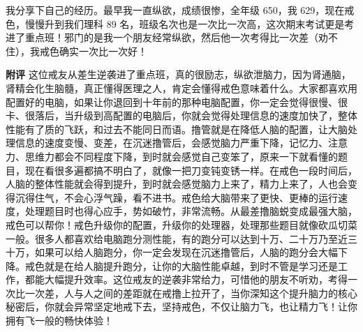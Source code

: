\begin{case}
    我分享下自己的经历。最早我一直纵欲，成绩很惨，全年级 650，我 629，现在戒色，慢慢升到我们理科 89 名，班级名次也是一次比一次高，这次期末考试更是考进了重点班！邪门的是我一个朋友经常纵欲，然后他一次考得比一次差（劝不住），我戒色确实一次比一次好！

    \textbf{附评} 这位戒友从差生逆袭进了重点班，真的很励志，纵欲泄脑力，因为肾通脑，肾精会化生脑髓，真正懂得医理之人，肯定会懂得戒色意味着什么。大家都喜欢用配置好的电脑，如果让你退回到十年前的那种电脑配置，你一定会觉得很慢、很卡、很落后，当升级到高配置的电脑后，你就会觉得处理信息的速度加快了，整体性能有了质的飞跃，和过去不能同日而语。撸管就是在降低人脑的配置，让大脑处理信息的速度变慢、变差，在沉迷撸管后，会感觉脑力严重下降，记忆力、注意力、思维力都会不同程度下降，到时就会感觉自己变笨了，原来一下就看懂的题目，现在看很多遍都搞不明白了，就像一把刀变钝变锈一样。在戒色一段时间后，人脑的整体性能就会得到提升，到时就会感觉脑力上来了，精力上来了，人也会变得沉得住气，不会心浮气躁，看不进书。戒色给大脑带来了更快、更棒的运行速度，处理题目时也得心应手，势如破竹，非常流畅。从最差撸脑蜕变成最强大脑，戒色可以帮你！戒色升级你的配置，升级你的处理器，处理那些题目就像砍瓜切菜一般。很多人都喜欢给电脑跑分测性能，有的跑分可以达到十万、二十万乃至近三十万，如果可以给人脑跑分，你一定会发现在沉迷撸管后，人脑的跑分会大幅下降。戒色就是在给人脑提升跑分，让你的大脑性能卓越，到时不管是学习还是工作，都能大幅提升效率。这位戒友的逆袭非常给力，可惜他的朋友不听劝，考得一次比一次差，人与人之间的差距就在戒撸上拉开了，当你深知这个提升脑力的核心秘密后，你就会异常坚定地戒下去，坚持戒色，不仅让脑力飞，也让精力飞！让你拥有飞一般的畅快体验！
\end{case}

